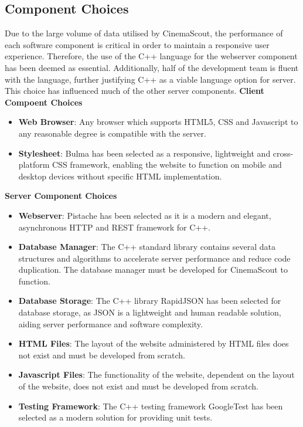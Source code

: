 \documentclass{article}
\begin{document}
\subsection{Component Choices}
Due to the large volume of data utilised by CinemaScout, the performance of each
software component is critical in order to maintain a responsive user experience.
Therefore, the use of the C++ language for the webserver component has been
deemed as essential. Additionally, half of the development team is fluent with
the language, further justifying C++ as a viable language option for server.
This choice has influenced much of the other server components.\newline\newline
\textbf{Client Compoent Choices}
\begin{itemize}
\item \textbf{Web Browser}: Any browser which supports HTML5, CSS and Javascript
to any reasonable degree is compatible with the server.
\item \textbf{Stylesheet}: Bulma has been selected as a responsive, lightweight
and cross-platform CSS framework, enabling the website to function on mobile
and desktop devices without specific HTML implementation.
\end{itemize}
\textbf{Server Component Choices}
\begin{itemize}
\item \textbf{Webserver}: Pistache has been selected as it is a modern and
elegant, asynchronous HTTP and REST framework for C++.
\item \textbf{Database Manager}: The C++ standard library contains several
data structures and algorithms to accelerate server performance and reduce
code duplication. The database manager must be developed for CinemaScout
to function.
\item \textbf{Database Storage}: The C++ library RapidJSON has been selected
for database storage, as JSON is a lightweight and human readable solution,
aiding server performance and software complexity.
\item \textbf{HTML Files}: The layout of the website administered by HTML files
does not exist and must be developed from scratch.
\item \textbf{Javascript Files}: The functionality of the website, dependent
on the layout of the website, does not exist and must be developed from scratch.
\item \textbf{Testing Framework}: The C++ testing framework GoogleTest has
been selected as a modern solution for providing unit tests.
\end{itemize}
\end{document}
